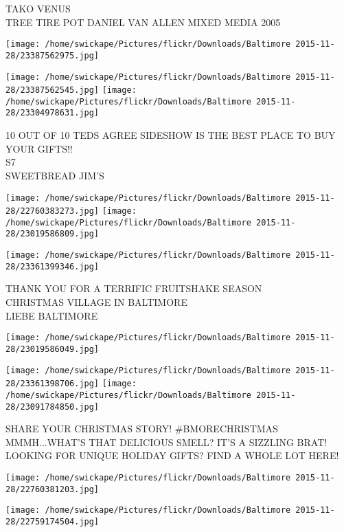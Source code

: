 \documentclass[10pt,letterpaper]{article}
\begin{document}
TAKO VENUS\\
TREE TIRE POT DANIEL VAN ALLEN MIXED MEDIA 2005
\pagebreak

\texttt{[image: /home/swickape/Pictures/flickr/Downloads/Baltimore 2015-11-28/23387562975.jpg]}

\vspace{0.25in}
\texttt{[image: /home/swickape/Pictures/flickr/Downloads/Baltimore 2015-11-28/23387562545.jpg]}
\texttt{[image: /home/swickape/Pictures/flickr/Downloads/Baltimore 2015-11-28/23304978631.jpg]}

10 OUT OF 10 TEDS AGREE SIDESHOW IS THE BEST PLACE TO BUY YOUR GIFTS!!\\
S7\\
SWEETBREAD JIM'S
\pagebreak

\texttt{[image: /home/swickape/Pictures/flickr/Downloads/Baltimore 2015-11-28/22760383273.jpg]}
\texttt{[image: /home/swickape/Pictures/flickr/Downloads/Baltimore 2015-11-28/23019586809.jpg]}

\vspace{0.25in}
\texttt{[image: /home/swickape/Pictures/flickr/Downloads/Baltimore 2015-11-28/23361399346.jpg]}

THANK YOU FOR A TERRIFIC FRUITSHAKE SEASON\\
CHRISTMAS VILLAGE IN BALTIMORE\\
LIEBE BALTIMORE
\pagebreak

\texttt{[image: /home/swickape/Pictures/flickr/Downloads/Baltimore 2015-11-28/23019586049.jpg]}

\vspace{0.25in}
\texttt{[image: /home/swickape/Pictures/flickr/Downloads/Baltimore 2015-11-28/23361398706.jpg]}
\texttt{[image: /home/swickape/Pictures/flickr/Downloads/Baltimore 2015-11-28/23091784850.jpg]}

SHARE YOUR CHRISTMAS STORY!  \#BMORECHRISTMAS\\
MMMH...WHAT'S THAT DELICIOUS SMELL?  IT'S A SIZZLING BRAT!\\
LOOKING FOR UNIQUE HOLIDAY GIFTS?  FIND A WHOLE LOT HERE!
\pagebreak

\texttt{[image: /home/swickape/Pictures/flickr/Downloads/Baltimore 2015-11-28/22760381203.jpg]}

\vspace{0.25in}
\texttt{[image: /home/swickape/Pictures/flickr/Downloads/Baltimore 2015-11-28/22759174504.jpg]}
\end{document}
